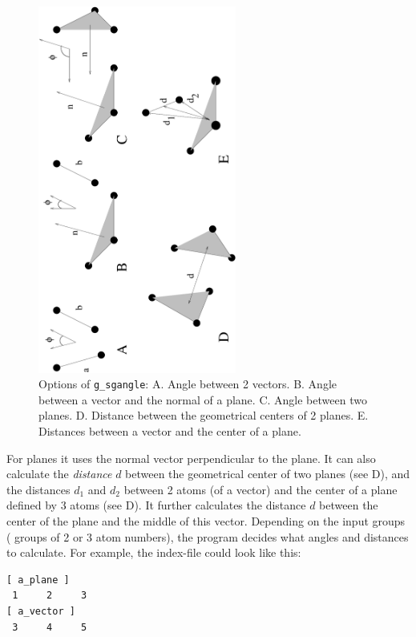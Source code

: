{\begin{figure}
\centerline{
{\includegraphics[width=6.5cm,angle=270]{plots/sgangle}}}
\caption[Options of {\tt g\_sgangle}.]{Options of {\tt g\_sgangle}: A. Angle between 2 vectors. B. Angle between a vector and the normal of a plane. C. Angle between two planes. D. Distance between the geometrical centers of 2 planes. E. Distances between a vector and the center of a plane.}
\label{fig:sgangle}
\end{figure}

For planes it uses the normal vector perpendicular to the plane.  It
can also calculate the {\em distance} $d$ between the geometrical
center of two planes (see D), and the distances
$d_1$ and $d_2$ between 2 atoms (of a vector) and the center of a
plane defined by 3 atoms (see D). It further
calculates the distance $d$ between the center of the plane and the
middle of this vector.  Depending on the input groups ({\ie} groups of
2 or 3 atom numbers), the program decides what angles and distances to
calculate. For example, the index-file could look like this:
{\samepage
\begin{verbatim}
[ a_plane ]
 1     2     3
[ a_vector ]
 3     4     5
\end{verbatim}}
} %


